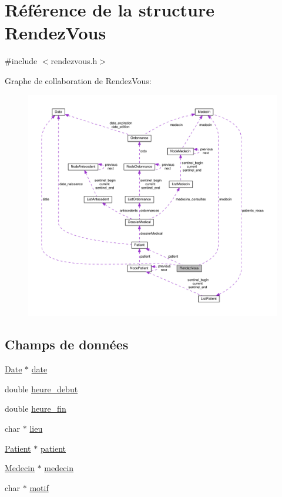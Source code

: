 \hypertarget{struct_rendez_vous}{\section{Référence de la structure Rendez\-Vous}
\label{struct_rendez_vous}
}


{\ttfamily \#include $<$rendezvous.\-h$>$}



Graphe de collaboration de Rendez\-Vous\-:
\nopagebreak
\begin{figure}[H]
\begin{center}
\leavevmode
\includegraphics[width=350pt]{struct_rendez_vous__coll__graph}
\end{center}
\end{figure}
\subsection*{Champs de données}
\begin{DoxyCompactItemize}
\item 
\hyperlink{struct_date}{Date} $\ast$ \hyperlink{struct_rendez_vous_a73fc78564c9badbcea68f2f2331c74db}{date}
\item 
double \hyperlink{struct_rendez_vous_a3877de0db2ba94f6179438f6ce2d79e4}{heure\-\_\-debut}
\item 
double \hyperlink{struct_rendez_vous_a91f724ef59fa01719e26c722ce70666f}{heure\-\_\-fin}
\item 
char $\ast$ \hyperlink{struct_rendez_vous_a4e5bf777d1128fd5e62442afa61ea3c9}{lieu}
\item 
\hyperlink{struct_patient}{Patient} $\ast$ \hyperlink{struct_rendez_vous_a602d93e6dfbb9a54fc31419f2463ac2b}{patient}
\item 
\hyperlink{struct_medecin}{Medecin} $\ast$ \hyperlink{struct_rendez_vous_a59131973441fcf6250df021bcf96d17c}{medecin}
\item 
char $\ast$ \hyperlink{struct_rendez_vous_ac1d72cddca5f2d79a6b2691aacd03850}{motif}
\end{DoxyCompactItemize}


